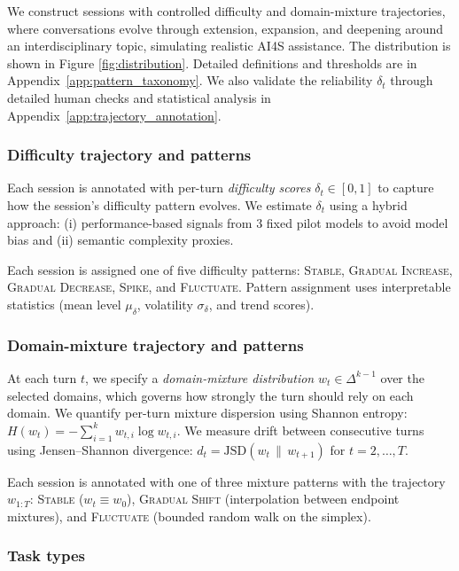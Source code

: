 We construct sessions with controlled difficulty and domain-mixture trajectories, where conversations evolve through extension, expansion, and deepening around an interdisciplinary topic, simulating realistic AI4S assistance. The distribution is shown in Figure \ref{fig:distribution}. Detailed definitions and thresholds are in Appendix~\ref{app:pattern_taxonomy}. We also validate the reliability $\delta_t$ through detailed human checks and statistical analysis in Appendix~\ref{app:trajectory_annotation}.

\subsubsection{Difficulty trajectory and patterns}
\label{sec:difficulty}

Each session is annotated with per-turn \emph{difficulty scores} $\delta_t \in [0,1]$ to capture how the session's difficulty pattern evolves.
We estimate $\delta_t$ using a hybrid approach: (i) performance-based signals from 3 fixed pilot models to avoid model bias and (ii) semantic complexity proxies.

Each session is assigned one of five difficulty patterns: \textsc{Stable}, \textsc{Gradual Increase}, \textsc{Gradual Decrease}, \textsc{Spike}, and \textsc{Fluctuate}.
Pattern assignment uses interpretable statistics (mean level $\mu_\delta$, volatility $\sigma_\delta$, and trend scores).

\subsubsection{Domain-mixture trajectory and patterns}
\label{sec:mixture}

At each turn $t$, we specify a \emph{domain-mixture distribution} $w_t \in \Delta^{k-1}$ over the selected domains, which governs how strongly the turn should rely on each domain.
We quantify per-turn mixture dispersion using Shannon entropy: $H(w_t) = -\sum_{i=1}^{k} w_{t,i} \log w_{t,i}$.
We measure drift between consecutive turns using Jensen--Shannon divergence: $d_t = \text{JSD}(w_t \,\|\, w_{t+1})$ for $t=2,\ldots,T$.

Each session is annotated with one of three mixture patterns with the trajectory $w_{1:T}$: \textsc{Stable} ($w_t \equiv w_0$), \textsc{Gradual Shift} (interpolation between endpoint mixtures), and \textsc{Fluctuate} (bounded random walk on the simplex).


\subsubsection{Task types}
\label{sec:task_types}

